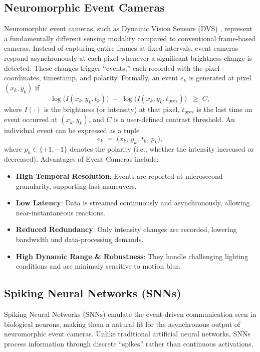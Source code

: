 \subsection{\textbf{Neuromorphic Event Cameras}}

Neuromorphic event cameras, such as Dynamic Vision Sensors (DVS) \cite{dvs1,dvs2,dvs3}, represent a fundamentally different sensing modality compared to conventional frame-based cameras. Instead of capturing entire frames at fixed intervals, event cameras respond asynchronously at each pixel whenever a significant brightness change is detected. These changes trigger ``events,'' each recorded with the pixel coordinates, timestamp, and polarity. Formally, an event $e_k$ is generated at pixel $(x_k, y_k)$ if
\begin{equation}
  \label{eq:eventcamera}
  \log\bigl(I(x_k,y_k,t_k)\bigr) \;-\; \log\bigl(I(x_k,y_k,t_{\text{prev}})\bigr)
  \;\;\geq\; C,
\end{equation}
where $I(\cdot)$ is the brightness (or intensity) at that pixel, $t_{\text{prev}}$ is the last time an event occurred at $(x_k, y_k)$, and $C$ is a user-defined contrast threshold. An individual event can be expressed as a tuple
\[
e_k \;=\; \bigl(x_k,\, y_k,\, t_k,\, p_k\bigr),
\]
where $p_k \in \{+1, -1\}$ denotes the polarity (i.e., whether the intensity increased or decreased). Advantages of Event Cameras include:
\begin{itemize}
  \item \textbf{High Temporal Resolution}: Events are reported at microsecond granularity, supporting fast maneuvers.
  \item \textbf{Low Latency}: Data is streamed continuously and asynchronously, allowing near-instantaneous reactions.
  \item \textbf{Reduced Redundancy}: Only intensity changes are recorded, lowering bandwidth and data-processing demands.
  \item \textbf{High Dynamic Range \& Robustness}: They handle challenging lighting conditions and are minimaly sensitive to motion blur.
\end{itemize}

\subsection{\textbf{Spiking Neural Networks (SNNs)}}

Spiking Neural Networks (SNNs) \cite{lif,lee2020spike} emulate the event-driven communication seen in biological neurons, making them a natural fit for the asynchronous output of neuromorphic event cameras. Unlike traditional artificial neural networks, SNNs process information through discrete ``spikes'' rather than continuous activations.\\

